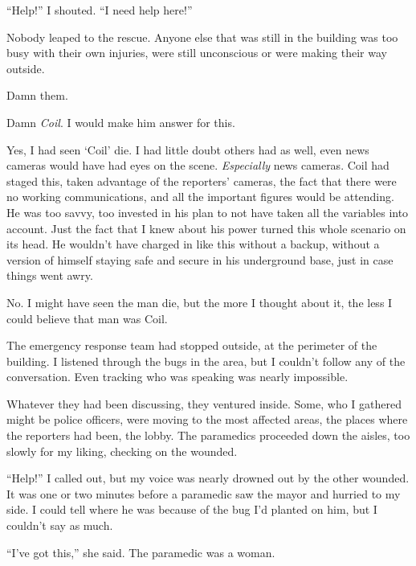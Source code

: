 ``Help!''  I shouted.  ``I need help here!''



Nobody leaped to the rescue.  Anyone else that was still in the building was too busy with their own injuries, were still unconscious or were making their way outside.



Damn them.



Damn \emph{Coil}.  I would make him answer for this.



Yes, I had seen `Coil' die.  I had little doubt others had as well, even news cameras would have had eyes on the scene.  \emph{Especially }news cameras.  Coil had staged this, taken advantage of the reporters' cameras, the fact that there were no working communications, and all the important figures would be attending.  He was too savvy, too invested in his plan to not have taken all the variables into account.  Just the fact that I knew about his power turned this whole scenario on its head.  He wouldn't have charged in like this without a backup, without a version of himself staying safe and secure in his underground base, just in case things went awry.



No.  I might have seen the man die, but the more I thought about it, the less I could believe that man was Coil.



The emergency response team had stopped outside, at the perimeter of the building.  I listened through the bugs in the area, but I couldn't follow any of the conversation.  Even tracking who was speaking was nearly impossible.



Whatever they had been discussing, they ventured inside.  Some, who I gathered might be police officers, were moving to the most affected areas, the places where the reporters had been, the lobby.  The paramedics proceeded down the aisles, too slowly for my liking, checking on the wounded.



``Help!'' I called out, but my voice was nearly drowned out by the other wounded.  It was one or two minutes before a paramedic saw the mayor and hurried to my side.  I could tell where he was because of the bug I'd planted on him, but I couldn't say as much.



``I've got this,'' she said.  The paramedic was a woman.



